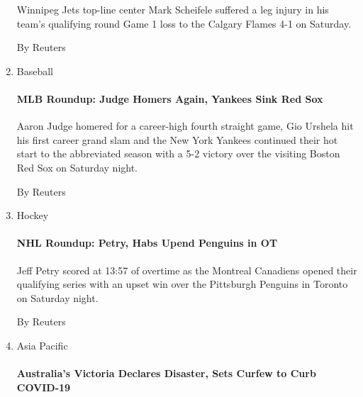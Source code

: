 \begin{enumerate}
  Winnipeg Jets top-line center Mark Scheifele suffered a leg injury in
  his team's qualifying round Game 1 loss to the Calgary Flames 4-1 on
  Saturday.

  By Reuters
\item
  Baseball

  \href{/reuters/2020/08/02/sports/baseball/02reuters-baseball-mlb-roundup.html?searchResultPosition=6}{}

  \hypertarget{mlb-roundup-judge-homers-again-yankees-sink-red-sox}{%
  \paragraph{MLB Roundup: Judge Homers Again, Yankees Sink Red
  Sox}\label{mlb-roundup-judge-homers-again-yankees-sink-red-sox}}

  Aaron Judge homered for a career-high fourth straight game, Gio
  Urshela hit his first career grand slam and the New York Yankees
  continued their hot start to the abbreviated season with a 5-2 victory
  over the visiting Boston Red Sox on Saturday night.

  By Reuters
\item
  Hockey

  \href{/reuters/2020/08/02/sports/hockey/02reuters-icehockey-nhl-roundup.html?searchResultPosition=7}{}

  \hypertarget{nhl-roundup-petry-habs-upend-penguins-in-ot}{%
  \paragraph{NHL Roundup: Petry, Habs Upend Penguins in
  OT}\label{nhl-roundup-petry-habs-upend-penguins-in-ot}}

  Jeff Petry scored at 13:57 of overtime as the Montreal Canadiens
  opened their qualifying series with an upset win over the Pittsburgh
  Penguins in Toronto on Saturday night.

  By Reuters
\item
  Asia Pacific

  \href{/reuters/2020/08/02/world/asia/02reuters-health-coronavirus-australia.html?searchResultPosition=8}{}

  \hypertarget{australias-victoria-declares-disaster-sets-curfew-to-curb-covid-19}{%
  \paragraph{Australia's Victoria Declares Disaster, Sets Curfew to Curb
  COVID-19}\label{australias-victoria-declares-disaster-sets-curfew-to-curb-covid-19}}


\end{enumerate}
